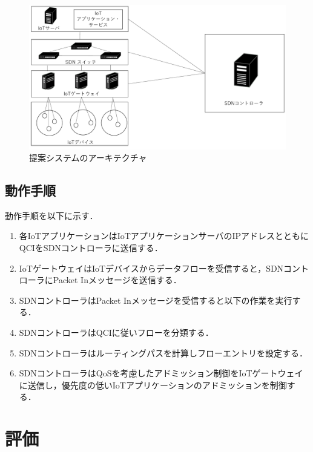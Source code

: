 \documentclass[a4paper,10pt,twocolumn,uplatex]{jsarticle}
\begin{document}
\begin{figure}[!tb]
  \centering
  \includegraphics[width=\linewidth]{img/AQRA_Architecture.pdf}
  \caption{提案システムのアーキテクチャ}
  \label{fig:Architecture}
\end{figure}

\subsection{動作手順}
動作手順を以下に示す．

\begin{enumerate} %
  \item 各IoTアプリケーションはIoTアプリケーションサーバのIPアドレスとともにQCIをSDNコントローラに送信する．
  \item IoTゲートウェイはIoTデバイスからデータフローを受信すると，SDNコントローラにPacket Inメッセージを送信する．
  \item SDNコントローラはPacket Inメッセージを受信すると以下の作業を実行する．
  \item SDNコントローラはQCIに従いフローを分類する．
  \item SDNコントローラはルーティングパスを計算しフローエントリを設定する．
  \item SDNコントローラはQoSを考慮したアドミッション制御をIoTゲートウェイに送信し，優先度の低いIoTアプリケーションのアドミッションを制御する．
\end{enumerate}

\section{評価}
\end{document}

